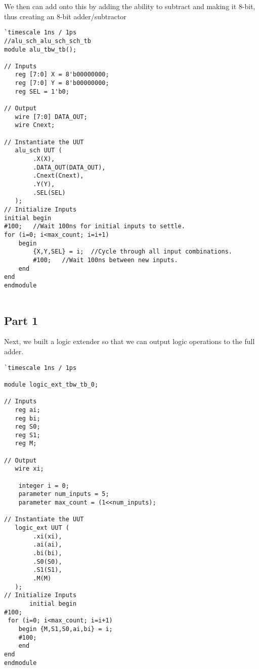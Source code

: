 \documentclass[12pt]{article}
\begin{document}
		We then can add onto this by adding the ability to subtract and making it 8-bit, thus creating an 8-bit adder/subtractor
		
		
		\begin{Verbatim}[frame=single, fontsize= \small]
`timescale 1ns / 1ps
//alu_sch_alu_sch_sch_tb
module alu_tbw_tb();

// Inputs
   reg [7:0] X = 8'b00000000;
   reg [7:0] Y = 8'b00000000;
   reg SEL = 1'b0;

// Output
   wire [7:0] DATA_OUT;
   wire Cnext;

// Instantiate the UUT
   alu_sch UUT (
		.X(X), 
		.DATA_OUT(DATA_OUT), 
		.Cnext(Cnext), 
		.Y(Y), 
		.SEL(SEL)
   );
// Initialize Inputs
initial begin     
#100;   //Wait 100ns for initial inputs to settle.      
for (i=0; i<max_count; i=i+1)           
	begin             
		{X,Y,SEL} = i;  //Cycle through all input combinations.             
		#100;   //Wait 100ns between new inputs.         
	end 
end 
endmodule
			
		\end{Verbatim}

		\newpage
	\subsection{Part 1}
		Next, we built a logic extender so that we can output logic operations to the full adder.
	
		\begin{Verbatim}[frame=single, fontsize= \small]
`timescale 1ns / 1ps

module logic_ext_tbw_tb_0;

// Inputs
   reg ai;
   reg bi;
   reg S0;
   reg S1;
   reg M;

// Output
   wire xi;
	
	integer i = 0; 
	parameter num_inputs = 5; 
	parameter max_count = (1<<num_inputs);

// Instantiate the UUT
   logic_ext UUT (
		.xi(xi), 
		.ai(ai), 
		.bi(bi), 
		.S0(S0), 
		.S1(S1), 
		.M(M)
   );
// Initialize Inputs
       initial begin
#100;
 for (i=0; i<max_count; i=i+1)
	begin {M,S1,S0,ai,bi} = i; 
	#100; 
	end
end
endmodule			
		\end{Verbatim}
\end{document}
